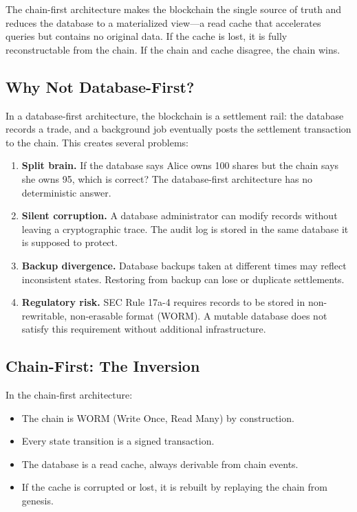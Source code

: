 \documentclass[11pt,a4paper]{article}
\begin{document}
The chain-first architecture makes the blockchain the single source of
truth and reduces the database to a materialized view---a read cache
that accelerates queries but contains no original data.  If the cache
is lost, it is fully reconstructable from the chain.  If the chain
and cache disagree, the chain wins.

\subsection{Why Not Database-First?}

In a database-first architecture, the blockchain is a settlement
rail: the database records a trade, and a background job eventually
posts the settlement transaction to the chain.  This creates several
problems:

\begin{enumerate}[nosep]
  \item \textbf{Split brain.}  If the database says Alice owns 100
        shares but the chain says she owns 95, which is correct?  The
        database-first architecture has no deterministic answer.
  \item \textbf{Silent corruption.}  A database administrator can
        modify records without leaving a cryptographic trace.  The
        audit log is stored in the same database it is supposed to
        protect.
  \item \textbf{Backup divergence.}  Database backups taken at
        different times may reflect inconsistent states.  Restoring
        from backup can lose or duplicate settlements.
  \item \textbf{Regulatory risk.}  SEC Rule 17a-4 requires records
        to be stored in non-rewritable, non-erasable format (WORM).
        A mutable database does not satisfy this requirement without
        additional infrastructure.
\end{enumerate}

\subsection{Chain-First: The Inversion}

In the chain-first architecture:

\begin{itemize}[nosep]
  \item The chain is WORM (Write Once, Read Many) by construction.
  \item Every state transition is a signed transaction.
  \item The database is a read cache, always derivable from chain
        events.
  \item If the cache is corrupted or lost, it is rebuilt by replaying
        the chain from genesis.
\end{itemize}
\end{document}
